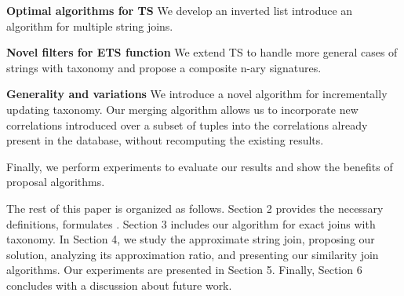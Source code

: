 \noindent \textbf{Optimal algorithms for TS} We develop an inverted list introduce an algorithm for multiple string joins.

\noindent \textbf{Novel filters for ETS function} We extend TS to handle more general cases of strings with taxonomy and propose a composite n-ary signatures.

\noindent \textbf{Generality and variations}  We introduce a novel algorithm for incrementally updating taxonomy. Our merging algorithm allows us to incorporate new correlations introduced over a subset of tuples into
the correlations already present in the database, without recomputing the existing results.


Finally, we perform experiments to evaluate our results and show the benefits of proposal algorithms.


\smallskip

The rest of this paper is organized as follows. Section 2
provides the necessary definitions, formulates . Section
3 includes our algorithm for exact joins with taxonomy. In Section 4, we study
the approximate string join, proposing our solution, analyzing its approximation
ratio, and presenting our similarity join algorithms.
Our experiments are presented in Section 5. Finally,
Section 6 concludes with a discussion about future work.
